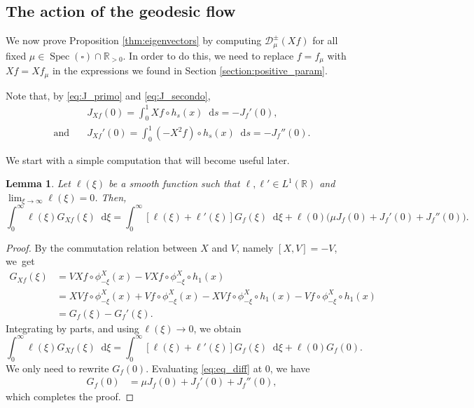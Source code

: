 \documentclass[11pt]{article}
\newcommand \R{\mathbb{R}}
\newcommand*{\diff}{\mathop{}\!\mathrm{d}}
\newcommand{\Dpmp}[1]{\mathcal{D}_\mu^{\pm}(#1)}
\DeclareMathOperator{\Spec}{Spec}
\newtheorem {lemma}[theorem]{Lemma}
\theoremstyle{definition}
\begin{document}
\subsection{The action of the geodesic flow}\label{section:geo_action}

We now prove Proposition \ref{thm:eigenvectors} by computing $\Dpmp{Xf}$ for all fixed $\mu \in \Spec(\square) \cap \R_{>0}$.
In order to do this, we need to replace $f=f_\mu$ with $Xf= Xf_\mu$ in the expressions we found in Section \ref{section:positive_param}.

Note that, by \eqref{eq:J_primo} and \eqref{eq:J_secondo},
\begin{equation}\label{eq:JX}
\begin{split}
&J_{Xf}(0) = \int_0^1 Xf \circ h_s(x) \diff s = -J_f'(0),\\
\text{and}\quad &J_{Xf}'(0)= \int_0^1 (-X^2f) \circ h_s(x) \diff s =- J_f''(0).
\end{split}
\end{equation}

We start with a simple computation that will become useful later.
\begin{lemma}\label{lemma:aGx}
Let $\ell(\xi)$ be a smooth function such that $\ell, \ell' \!\!\in\! L^1(\R)$ and \hbox{$\lim_{\xi \to \infty}\!\ell(\xi)\!=\!0$}. Then,
\[
\int_0^\infty \ell(\xi) G_{Xf}(\xi) \diff \xi = \int_0^\infty [\ell(\xi)+\ell'(\xi)] G_f(\xi) \diff \xi + \ell(0)\bigl(\mu J_f(0) + J_f'(0) + J_f''(0) \bigr).
\]
\end{lemma}
\begin{proof}
By the commutation relation between $X$ and $V$, namely $[X,V]=-V$, we~get
\begin{equation*}
\begin{split}
G_{Xf}(\xi) &= VXf \circ \phi^X_{-\xi}(x) - VXf \circ \phi^X_{-\xi} \circ h_1(x) \\
&= XVf \circ \phi^X_{-\xi}(x) +Vf \circ \phi^X_{-\xi}(x) - XVf \circ \phi^X_{-\xi} \circ h_1(x) -Vf \circ \phi^X_{-\xi} \circ h_1(x) \\
&= G_f(\xi) - G_f'(\xi).
\end{split}
\end{equation*}
Integrating by parts, and using $\ell(\xi) \to 0$, we obtain
\[
\int_0^\infty \ell(\xi) G_{Xf}(\xi) \diff \xi = \int_0^\infty [\ell(\xi)+\ell'(\xi)] G_f(\xi) \diff \xi + \ell(0)G_f(0).
\]
We only need to rewrite $G_f(0)$. Evaluating \eqref{eq:eq_diff} at $0$, we have
\begin{equation*}
\begin{split}
G_f(0) &=\mu J_f(0) + J_f'(0) + J_f''(0),
\end{split}
\end{equation*}
which completes the proof.
\end{proof}
\end{document}

